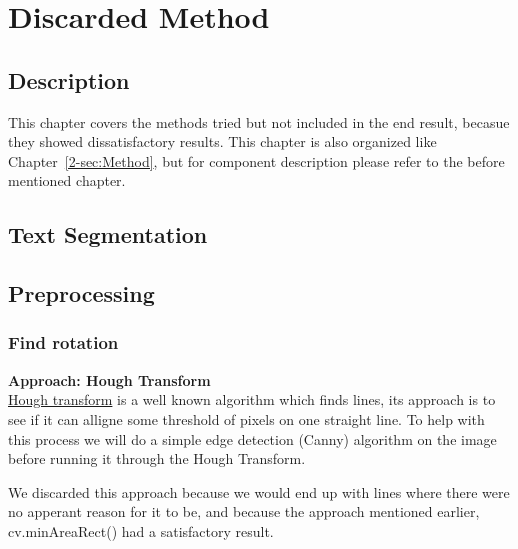 \documentclass[Report.tex]{subfiles}
\begin{document}
\chapter{Discarded Method}
\label{sec:Discarded Method}
\section{Description}
This chapter covers the methods tried but not included in the end result,
becasue they showed dissatisfactory results. This chapter is also organized
like Chapter~\ref{2-sec:Method}, but for component description please refer to
the before mentioned chapter.

\section{Text Segmentation}
\section{Preprocessing}
\subsection{Find rotation}

\begin{flushleft}
  \textbf{Approach: Hough Transform} \\
  \href{https://en.wikipedia.org/wiki/Hough_transform}{Hough transform} is a
  well known algorithm which finds lines, its approach is to see if it can
  alligne some threshold of pixels on one straight line. To help with this
  process we will do a simple edge detection (Canny) algorithm on the image
  before running it through the Hough Transform. \par
  We discarded this approach because we would end up with lines where there
  were no apperant reason for it to be, and because the approach mentioned
  earlier, cv.minAreaRect() had a satisfactory result.
\end{flushleft}
\end{document}
